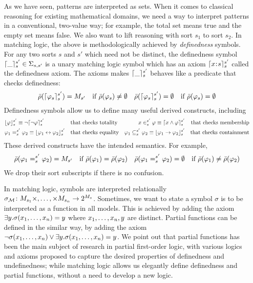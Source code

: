 \documentclass{amsart}
\begin{document}
As we have seen, patterns are interpreted as sets.
When it comes to classical reasoning for existing mathematical domains,
we need a way to interpret patterns in a conventional, two-value way;
for example, the total set means true and the empty set means false.
We also want to lift reasoning with sort $s_1$ to sort $s_2$.
In matching logic, the above is methodologically achieved by
\emph{definedness} symbols.
For any two sorts $s$ and $s'$ which need not be distinct, 
the definedness symbol
$\lceil\_\rceil_{s}^{s'} \in \Sigma_{s,s'}$
is a unary matching logic symbol which has an axiom
$
\lceil x \mathbin{\!:\!} s\rceil_{s}^{s'}
$
called the definedness axiom. 
The axioms makes $\lceil\_\rceil_{s}^{s'}$ behaves like a predicate
that checks definedness:
\begin{align*}
& \bar{\rho}(\lceil\varphi_s\rceil_{s}^{s'}) = M_{s'}
  \quad \text{if $\bar{\rho}(\varphi_s) \neq \emptyset$}
& \bar{\rho}(\lceil\varphi_s\rceil_{s}^{s'}) = \emptyset
  \quad \text{if $\bar{\rho}(\varphi_s) = \emptyset$}
\end{align*}
Definedness symbols allow us to define many useful derived constructs, including
\begin{align*}
&\lfloor\varphi\rfloor_s^{s'} \equiv \neg \lceil\neg \varphi\rceil_s^{s'}
&& \text{that checks totality}
&x \in_s^{s'} \varphi \equiv \lceil x \wedge \varphi\rceil_s^{s'}
&& \text{that checks membership}
\\
&\varphi_1 =_s^{s'} \varphi_2 \equiv \lfloor\varphi_1 \leftrightarrow \varphi_2\rfloor_s^{s'}
&& \text{that checks equality}
&\varphi_1 \subseteq_s^{s'} \varphi_2 
\equiv \lfloor\varphi_1 \to \varphi_2\rfloor_s^{s'}
&& \text{that checks containment}
\end{align*}
These derived constructs have the intended semantics.
For example,
\begin{align*}
& \bar{\rho}(\varphi_1 =_{s}^{s'} \varphi_2) = M_{s'}
  \quad \text{if $\bar{\rho}(\varphi_1) = \bar{\rho}(\varphi_2)$}
& \bar{\rho}(\varphi_1 =_{s}^{s'} \varphi_2) = \emptyset
  \quad \text{if $\bar{\rho}(\varphi_1) \neq \bar{\rho}(\varphi_2)$}
\end{align*}
We drop their sort subscripts if there is no confusion.

In matching logic, symbols are interpreted relationally
${\sigma_{\mathcal{M}}} \colon M_{s_1} \times ,\dots, \times M_{s_n} \to 2^{M_s}$.
Sometimes, we want to state a symbol $\sigma$ is to be interpreted
as a function in all models.
This is achieved by adding the axiom
$\exists y . \sigma(x_1 ,\dots, x_n) = y$
where $x_1 ,\dots, x_n , y$ are distinct.
Partial functions can be defined in the similar way, by adding the axiom
$\neg \sigma(x_1 ,\dots, x_n) \vee \exists y . \sigma(x_1 ,\dots, x_n) = y$.
We point out that partial functions has been the main subject of research
in partial first-order logic, with various logics and axioms proposed
to capture the desired properties of definedness and undefinedness;
while matching logic allows us elegantly define definedness and partial 
functions, without a need to develop a new logic.
\end{document}
